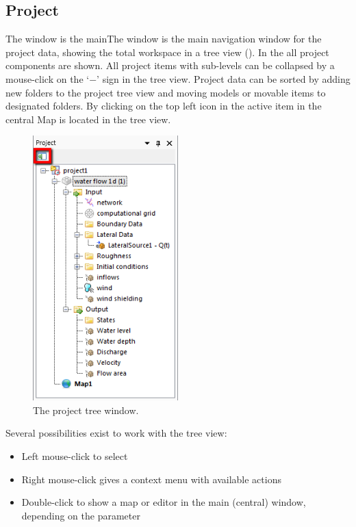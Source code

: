 \subsection{Project}
\label{subsec:project}
The  window is the mainThe  window is the main navigation window for the project data, showing the total workspace in a tree view (). In the  all project components are shown. 
%
All project items with sub-levels can be collapsed by a mouse-click on the `$-$' sign in the tree view. Project data can be sorted by adding new folders to the project tree view and moving models or movable items to designated folders.
%
By clicking on the top left icon in  the active item in the central Map is located in the tree view.
%
\begin{figure} [H]
	\centering
		\includegraphics[width=0.5\textwidth]{figures/chapter_overview/view_project_window.png}
	\caption{The project tree window.}
	\label{fig:fig2.2}
\end{figure}
%
Several possibilities exist to work with the tree view:
%
\begin{itemize}
	\item Left mouse-click to select
	\item Right mouse-click gives a context menu with available actions
	\item Double-click to show a map or editor in the main (central) window, depending on the parameter
\end{itemize}
%

